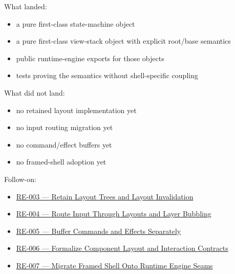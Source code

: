 What landed:

\begin{itemize}
\tightlist
\item
  a pure first-class state-machine object
\item
  a pure first-class view-stack object with explicit root/base semantics
\item
  public runtime-engine exports for those objects
\item
  tests proving the semantics without shell-specific coupling
\end{itemize}

What did not land:

\begin{itemize}
\tightlist
\item
  no retained layout implementation yet
\item
  no input routing migration yet
\item
  no command/effect buffers yet
\item
  no framed-shell adoption yet
\end{itemize}

Follow-on:

\begin{itemize}
\tightlist
\item
  \href{https://github.com/flyingrobots/bijou/blob/cbd70612140e7a450d764b3c7be1c6af878b99bc/docs/design/RE-003-retain-layout-trees-and-layout-invalidation.md}{RE-003 --- Retain Layout Trees and Layout Invalidation}
\item
  \href{https://github.com/flyingrobots/bijou/blob/cbd70612140e7a450d764b3c7be1c6af878b99bc/docs/design/RE-004-route-input-through-layouts-and-layer-bubbling.md}{RE-004 --- Route Input Through Layouts and Layer Bubbling}
\item
  \href{https://github.com/flyingrobots/bijou/blob/cbd70612140e7a450d764b3c7be1c6af878b99bc/docs/design/RE-005-buffer-commands-and-effects-separately.md}{RE-005 --- Buffer Commands and Effects Separately}
\item
  \href{https://github.com/flyingrobots/bijou/blob/cbd70612140e7a450d764b3c7be1c6af878b99bc/docs/design/RE-006-formalize-component-layout-and-interaction-contracts.md}{RE-006 --- Formalize Component Layout and Interaction Contracts}
\item
  \href{https://github.com/flyingrobots/bijou/blob/cbd70612140e7a450d764b3c7be1c6af878b99bc/docs/method/graveyard/legacy-backlog/up-next/RE-007-migrate-framed-shell-onto-runtime-engine-seams.md}{RE-007 --- Migrate Framed Shell Onto Runtime Engine Seams}
\end{itemize}


